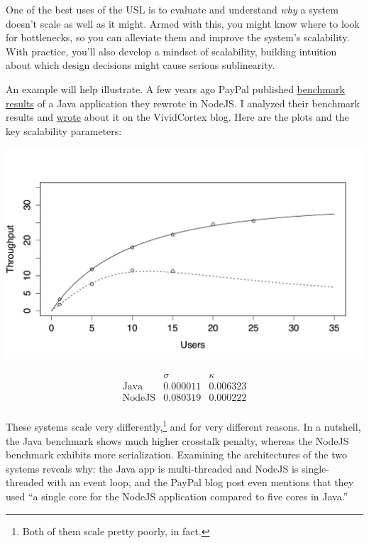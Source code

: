 \documentclass{vivid_layout}
\begin{document}
One of the best uses of the USL is to evaluate and understand {\itshape why} a
system doesn't scale as well as it might. Armed with this, you might know where
to look for bottlenecks, so you can alleviate them and improve the system's
scalability. With practice, you'll also develop a mindset of scalability,
building intuition about which design decisions might cause serious
sublinearity.

An example will help illustrate. A few years ago PayPal published
\href{https://www.paypal-engineering.com/2013/11/22/node-js-at-paypal/}{benchmark
results} of a Java application they rewrote in NodeJS. I analyzed their
benchmark results and
\href{https://www.vividcortex.com/blog/2013/12/09/analysis-of-paypals-node-vs-java-benchmarks/}{wrote} about it on the VividCortex blog.
Here are the plots and the key scalability parameters:
\begin{center}
\includegraphics[width=.85\linewidth]{scalability/paypal}
\end{center}
\[
\begin{array}{lcc}
& \sigma & \kappa \\
\mbox{Java} & 0.000011 & 0.006323 \\
\mbox{NodeJS} &  0.080319 & 0.000222 \\
\end{array}
\]

These systems scale very differently,\footnote{Both of them scale pretty poorly,
in fact.} and for very different reasons.  In a nutshell, the Java benchmark
shows much higher crosstalk penalty, whereas the NodeJS benchmark exhibits more
serialization. Examining the architectures of the two systems reveals why: the
Java app is multi-threaded and NodeJS is single-threaded with an event loop, and
the PayPal blog post even mentions that they used ``a single core for the
NodeJS application compared to five cores in Java.''
\end{document}
